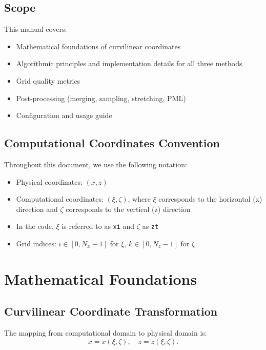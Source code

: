 \documentclass[11pt,a4paper]{report}
\begin{document}
\section{Scope}

This manual covers:
\begin{itemize}
    \item Mathematical foundations of curvilinear coordinates
    \item Algorithmic principles and implementation details for all three methods
    \item Grid quality metrics
    \item Post-processing (merging, sampling, stretching, PML)
    \item Configuration and usage guide
\end{itemize}

\section{Computational Coordinates Convention}

Throughout this document, we use the following notation:
\begin{itemize}
    \item Physical coordinates: $(x, z)$
    \item Computational coordinates: $(\xi, \zeta)$, where $\xi$ corresponds to the horizontal (x) direction and $\zeta$ corresponds to the vertical (z) direction
    \item In the code, $\xi$ is referred to as \texttt{xi} and $\zeta$ as \texttt{zt}
    \item Grid indices: $i \in [0, N_x-1]$ for $\xi$, $k \in [0, N_z-1]$ for $\zeta$
\end{itemize}

\chapter{Mathematical Foundations}

\section{Curvilinear Coordinate Transformation}

The mapping from computational domain to physical domain is:
\begin{equation}
    x = x(\xi, \zeta), \quad z = z(\xi, \zeta).
\end{equation}
\end{document}
